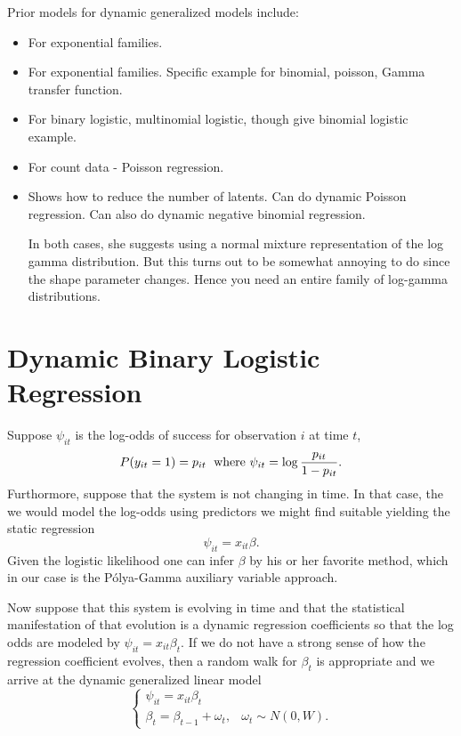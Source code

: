 \documentclass[11pt]{article}
\newcommand{\Polya}{P\'{o}lya}
\begin{document}
Prior models for dynamic generalized models include:

\begin{itemize}
\item \cite{west-etal-1985}

  For exponential families.

\item \cite{ravines-etal-2006}

  For exponential families.  Specific example for binomial, poisson, Gamma
  transfer function.

\item \cite{fruhwirth-schnatter-fruhwirth-2007}

  For binary logistic, multinomial logistic, though give binomial logistic example.

\item \cite{fruhwirth-schnatter-wagner-2006}

  For count data - Poisson regression.

\item \cite{fruhwirth-schnatter-etal-2009}

  Shows how to reduce the number of latents.  Can do dynamic Poisson regression.
  Can also do dynamic negative binomial regression.

  In both cases, she suggests using a normal mixture representation of the log
  gamma distribution.  But this turns out to be somewhat annoying to do since
  the shape parameter changes.  Hence you need an entire family of log-gamma
  distributions.

\end{itemize}

\section{Dynamic Binary Logistic Regression}

Suppose $\psi_{it}$ is the log-odds of success for observation $i$ at time $t$,
\[
P(y_{it}=1) = p_{it} \; \textmd{ where } \psi_{it} = \log \frac{p_{it}}{1-p_{it}}.
\]
Furthormore, suppose that the system is not changing in time.  In that case, the
we would model the log-odds using predictors we might find suitable yielding the
static regression
\[
\psi_{it} = x_{it} \beta.
\]
Given the logistic likelihood one can infer $\beta$ by his or her favorite
method, which in our case is the \Polya-Gamma auxiliary variable approach.

Now suppose that this system is evolving in time and that the statistical
manifestation of that evolution is a dynamic regression coefficients so that the
log odds are modeled by \( \psi_{it} = x_{it} \beta_t.  \) If we do not have a
strong sense of how the regression coefficient evolves, then a random walk for
$\beta_t$ is appropriate and we arrive at the dynamic generalized linear model
\[
\begin{cases}
\psi_{it} = x_{it} \beta_t \\
\beta_t = \beta_{t-1} + \omega_t, & \omega_t \sim N(0, W).
\end{cases}
\]
\end{document}
